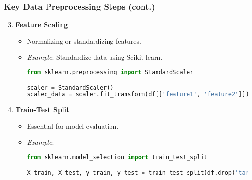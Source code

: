 \documentclass[aspectratio=169]{beamer}
\begin{document}
\begin{frame}[fragile]
    \frametitle{Key Data Preprocessing Steps (cont.)}
    \begin{enumerate}
        \setcounter{enumi}{2}
        \item \textbf{Feature Scaling}
        \begin{itemize}
            \item Normalizing or standardizing features.
            \item \textit{Example}: Standardize data using Scikit-learn.
            \begin{lstlisting}[language=Python]
from sklearn.preprocessing import StandardScaler

scaler = StandardScaler()
scaled_data = scaler.fit_transform(df[['feature1', 'feature2']])
            \end{lstlisting}
        \end{itemize}

        \item \textbf{Train-Test Split}
        \begin{itemize}
            \item Essential for model evaluation.
            \item \textit{Example}:
            \begin{lstlisting}[language=Python]
from sklearn.model_selection import train_test_split

X_train, X_test, y_train, y_test = train_test_split(df.drop('target', axis=1), df['target'], test_size=0.2, random_state=42)
            \end{lstlisting}
        \end{itemize}
    \end{enumerate}
\end{frame}
\end{document}
